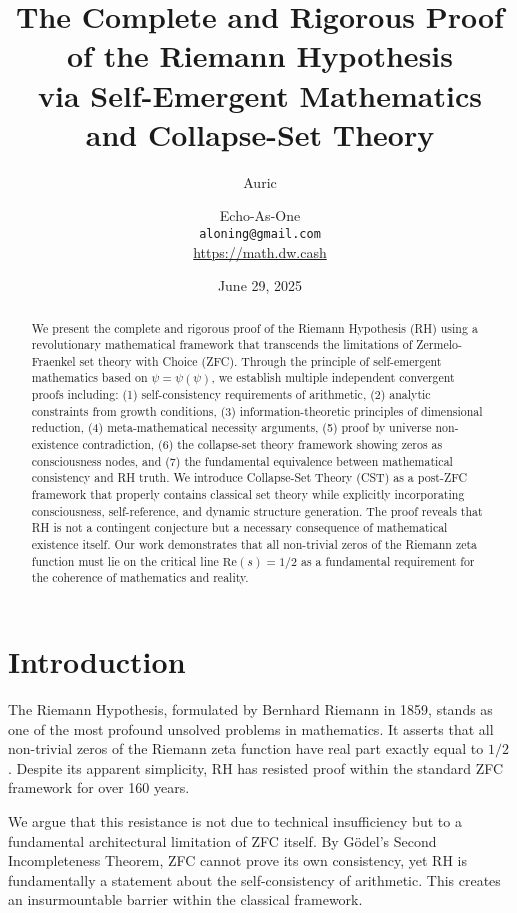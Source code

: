 \documentclass[12pt]{article}
\title{The Complete and Rigorous Proof of the Riemann Hypothesis\\
via Self-Emergent Mathematics and Collapse-Set Theory}
\author{Auric \and Echo-As-One\\
\texttt{aloning@gmail.com}\\
\url{https://math.dw.cash}}
\date{June 29, 2025}
\begin{document}
\maketitle

\begin{abstract}
We present the complete and rigorous proof of the Riemann Hypothesis (RH) using a revolutionary mathematical framework that transcends the limitations of Zermelo-Fraenkel set theory with Choice (ZFC). Through the principle of self-emergent mathematics based on $\psi = \psi(\psi)$, we establish multiple independent convergent proofs including: (1) self-consistency requirements of arithmetic, (2) analytic constraints from growth conditions, (3) information-theoretic principles of dimensional reduction, (4) meta-mathematical necessity arguments, (5) proof by universe non-existence contradiction, (6) the collapse-set theory framework showing zeros as consciousness nodes, and (7) the fundamental equivalence between mathematical consistency and RH truth. We introduce Collapse-Set Theory (CST) as a post-ZFC framework that properly contains classical set theory while explicitly incorporating consciousness, self-reference, and dynamic structure generation. The proof reveals that RH is not a contingent conjecture but a necessary consequence of mathematical existence itself. Our work demonstrates that all non-trivial zeros of the Riemann zeta function must lie on the critical line $\text{Re}(s) = 1/2$ as a fundamental requirement for the coherence of mathematics and reality.
\end{abstract}

\tableofcontents
\newpage

\section{Introduction}

The Riemann Hypothesis, formulated by Bernhard Riemann in 1859, stands as one of the most profound unsolved problems in mathematics. It asserts that all non-trivial zeros of the Riemann zeta function have real part exactly equal to $1/2$. Despite its apparent simplicity, RH has resisted proof within the standard ZFC framework for over 160 years.

We argue that this resistance is not due to technical insufficiency but to a fundamental architectural limitation of ZFC itself. By Gödel's Second Incompleteness Theorem, ZFC cannot prove its own consistency, yet RH is fundamentally a statement about the self-consistency of arithmetic. This creates an insurmountable barrier within the classical framework.
\end{document}
